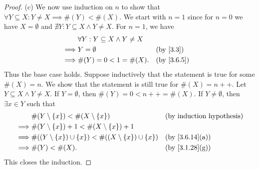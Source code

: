 \begin{proof}{(c)}
	We now use induction on \(n\) to show that \(\forall Y \subseteq X : Y \neq X \implies \#(Y) < \#(X)\).
	We start with \(n = 1\) since for \(n = 0\) we have \(X = \emptyset\) and \(\nexists Y : Y \subseteq X \land Y \neq X\).
	For \(n = 1\), we have
	\begin{align*}
		         & \forall Y : Y \subseteq X \land Y \neq X                 \\
		\implies & Y = \emptyset                            &  & \by{3.3}   \\
		\implies & \#(Y) = 0 < 1 = \#(X).                   &  & \by{3.6.5}
	\end{align*}
	Thus the base case holds.
	Suppose inductively that the statement is true for some \(\#(X) = n\).
	We show that the statement is still true for \(\#(X) = n++\).
	Let \(Y \subseteq X \land Y \neq X\).
	If \(Y = \emptyset\), then \(\#(Y) = 0 < n++ = \#(X)\).
	If \(Y \neq \emptyset\), then \(\exists x \in Y\) such that
	\begin{align*}
		         & \#(Y \setminus \set{x}) < \#(X \setminus \set{x})                               &  & \byIH                        \\
		\implies & \#(Y \setminus \set{x}) + 1 < \#(X \setminus \set{x}) + 1                                                         \\
		\implies & \#((Y \setminus \set{x}) \cup \set{x}) < \#((X \setminus \set{x}) \cup \set{x}) &  & \text{(by \cref{3.6.14}(a))} \\
		\implies & \#(Y) < \#(X).                                                                  &  & \text{(by \cref{3.1.28}(g))}
	\end{align*}
	This closes the induction.
\end{proof}

